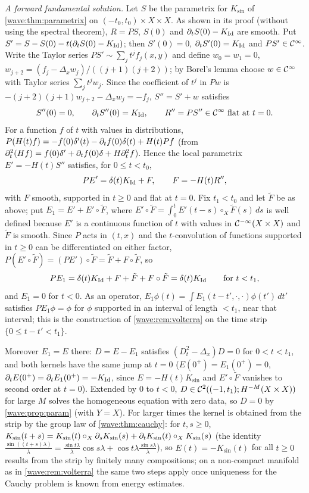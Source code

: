 \emph{A forward fundamental solution.} Let $S$ be the parametrix for $K_{\sin}$ of
\cref{wave:thm:parametrix} on $(-t_0,t_0)\times X\times X$. As shown in its proof (without using the
spectral theorem), $R=PS$, $S(0)$ and $\partial_tS(0)-K_{\operatorname{Id}}$ are smooth. Put
$S'=S-S(0)-t(\partial_tS(0)-K_{\operatorname{Id}})$; then $S'(0)=0$, $\partial_tS'(0)=K_{\operatorname{Id}}$ and $PS'\in\mathcal{C}^\infty$. Write the
Taylor series $PS'\sim\sum_jt^jf_j(x,y)$ and define $w_0=w_1=0$,
$w_{j+2}=(f_j-\Delta_xw_j)/((j+1)(j+2))$; by Borel's lemma choose $w\in\mathcal{C}^\infty$ with Taylor series
$\sum_jt^jw_j$. Since the coefficient of $t^j$ in $Pw$ is $-(j+2)(j+1)w_{j+2}-\Delta_xw_j=-f_j$,
$S''=S'+w$ satisfies
\begin{equation*}
  S''(0)=0,\qquad\partial_tS''(0)=K_{\operatorname{Id}},\qquad R''=PS''\in\mathcal{C}^\infty\text{ flat at }t=0 .
\end{equation*}
For a function $f$ of $t$ with values in distributions, $P(H(t)f)=-f(0)\delta'(t)-\partial_tf(0)\delta(t)+H(t)Pf$
(from $\partial_t^2(Hf)=f(0)\delta'+\partial_tf(0)\delta+H\partial_t^2f$). Hence the local parametrix
$E'=-H(t)S''$ satisfies, for $0\le t<t_0$,
\begin{equation*}
  PE'=\delta(t)K_{\operatorname{Id}}+F,\qquad F=-H(t)R'',
\end{equation*}
with $F$ smooth, supported in $t\ge0$ and flat at $t=0$. Fix $t_1<t_0$ and let $\tilde F$ be as above;
put $E_1=E'+E'\circ\tilde F$, where $E'\circ\tilde F=\int_0^tE'(t-s)\circ_X\tilde F(s)\,ds$ is well
defined because $E'$ is a continuous function of $t$ with values in $\mathcal{C}^{-\infty}(X\times X)$ and $\tilde F$
is smooth. Since $P$ acts in $(t,x)$ and the $t$-convolution of functions supported in $t\ge0$ can be
differentiated on either factor, $P(E'\circ\tilde F)=(PE')\circ\tilde F=\tilde F+F\circ\tilde F$, so
\begin{equation*}
  PE_1=\delta(t)K_{\operatorname{Id}}+F+\tilde F+F\circ\tilde F=\delta(t)K_{\operatorname{Id}}\qquad\text{for }t<t_1,
\end{equation*}
and $E_1=0$ for $t<0$. As an operator, $E_1\phi(t)=\int E_1(t-t',\cdot,\cdot)\phi(t')\,dt'$ satisfies
$PE_1\phi=\phi$ for $\phi$ supported in an interval of length $<t_1$, near that interval; this is the
construction of \cref{wave:rem:volterra} on the time strip $\{0\le t-t'<t_1\}$.

Moreover $E_1=E$ there: $D=E-E_1$ satisfies $(D_t^2-\Delta_x)D=0$ for $0<t<t_1$, and both kernels have
the same jump at $t=0$ ($E(0^+)=E_1(0^+)=0$, $\partial_tE(0^+)=\partial_tE_1(0^+)=-K_{\operatorname{Id}}$, since
$E=-H(t)K_{\sin}$ and $E'\circ\tilde F$ vanishes to second order at $t=0$). Extended by $0$ to $t<0$,
$D\in\mathcal C^2((-1,t_1);H^{-M}(X\times X))$ for large $M$ solves the homogeneous equation with
zero data, so $D=0$ by \cref{wave:prop:param} (with $Y=X$). For larger times the kernel is obtained
from the strip by the group law of \cref{wave:thm:cauchy}: for $t,s\ge0$,
$K_{\sin}(t+s)=K_{\sin}(t)\circ_X\partial_sK_{\sin}(s)+\partial_tK_{\sin}(t)\circ_XK_{\sin}(s)$ (the identity
$\frac{\sin((t+s)\lambda)}\lambda=\frac{\sin t\lambda}\lambda\cos s\lambda+\cos t\lambda\frac{\sin s\lambda}\lambda$),
so $E(t)=-K_{\sin}(t)$ for all $t\ge0$ results from the strip by finitely many compositions; on a
non-compact manifold as in \cref{wave:rem:volterra} the same two steps apply once uniqueness for the
Cauchy problem is known from energy estimates.

